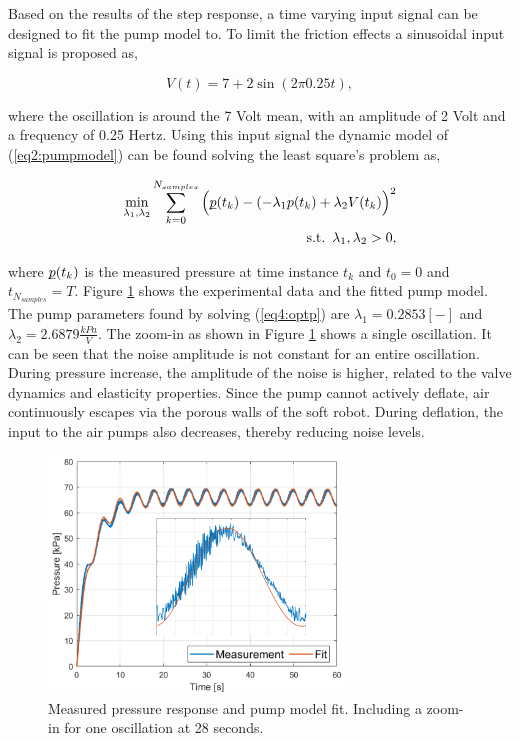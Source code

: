 Based on the results of the step response, a time varying input signal can be designed to fit the pump model to. To limit the friction effects a sinusoidal input signal is proposed as,

\begin{equation}
    V(t) =  7 + 2 \sin(2 \pi 0.25t),
    \label{eq3:vinput}
\end{equation}


where the oscillation is around the 7 Volt mean, with an amplitude of 2 Volt and a frequency of 0.25 Hertz. Using this input signal the dynamic model of (\ref{eq2:pumpmodel}) can be found solving the least square's problem as,


\begin{equation}
   \begin{aligned}
\min_{\lambda_1,\lambda_2} \sum_{k=0}^{N_{samples}} \Big(\underbar{$p$}(t_k) - (-\lambda_1 p(t_k) +\lambda_2 V(t_k)\Big)^2\\ 
\text{s.t.} \hspace{5pt} \lambda_1,\lambda_2 > 0,
\label{eq4:optp}
\end{aligned}
\end{equation}



where $\underbar{$p$}(t_k)$ is the measured pressure at time instance $t_k$ and $t_0 = 0$ and $t_{N_{samples}} = T$. Figure \ref{fig3:pumpfit} shows the experimental data and the fitted pump model. The pump parameters found by solving (\ref{eq4:optp}) are $\lambda_1 = 0.2853 [-]$ and $\lambda_2 = 2.6879 \frac{kPa}{V}$. The zoom-in as shown in Figure \ref{fig3:pumpfit} shows a single oscillation. It can be seen that the noise amplitude is not constant for an entire oscillation. During pressure increase, the amplitude of the noise is higher, related to the valve dynamics and elasticity properties. Since the pump cannot actively deflate, air continuously escapes via the porous walls of the soft robot. During deflation, the input to the air pumps also decreases, thereby reducing noise levels. 

\begin{figure}[H]
    \centering
    \includegraphics[width = 0.7\textwidth]{Figures/Chapter3/pressurewrap.png}
    \caption{Measured pressure response and pump model fit. Including a zoom-in for one oscillation at 28 seconds.}
    \label{fig3:pumpfit}
\end{figure}


